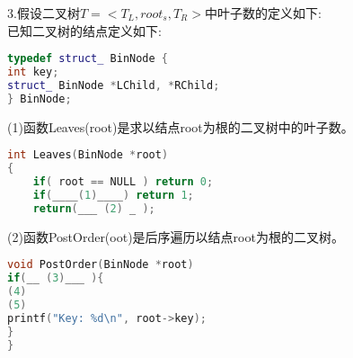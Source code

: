 3.假设二叉树$T=<T_L, root_s, T_R>$中叶子数的定义如下: \\
已知二叉树的结点定义如下:
\begin{lstlisting}[language=cpp]
typedef struct_ BinNode {
int key;
struct_ BinNode *LChild, *RChild;
} BinNode;
\end{lstlisting}
(1)函数Leaves(root)是求以结点root为根的二叉树中的叶子数。
\begin{lstlisting}[language=cpp]
int Leaves(BinNode *root)
{
    if( root == NULL ) return 0;
    if(____(1)____) return 1;
    return(___ (2) _ );
\end{lstlisting}
(2)函数PostOrder(oot)是后序遍历以结点root为根的二叉树。
\begin{lstlisting}[language=cpp]
void PostOrder(BinNode *root)
if(__ (3)___ ){
(4)
(5)
printf("Key: %d\n", root->key);
}
}
\end{lstlisting}

